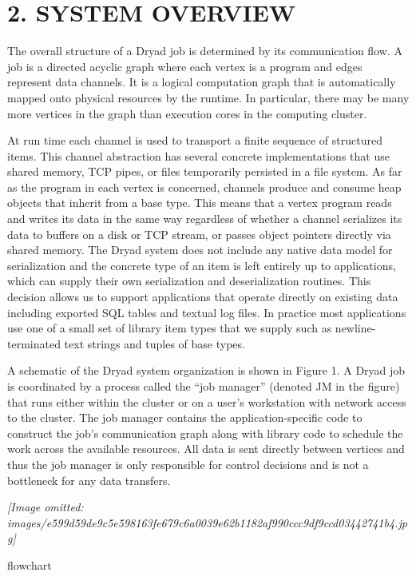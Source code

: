 \documentclass[
]{article}
\begin{document}
\section{2. SYSTEM OVERVIEW}\label{system-overview}

The overall structure of a Dryad job is determined by its communication
flow. A job is a directed acyclic graph where each vertex is a program
and edges represent data channels. It is a logical computation graph
that is automatically mapped onto physical resources by the runtime. In
particular, there may be many more vertices in the graph than execution
cores in the computing cluster.

At run time each channel is used to transport a finite sequence of
structured items. This channel abstraction has several concrete
implementations that use shared memory, TCP pipes, or files temporarily
persisted in a file system. As far as the program in each vertex is
concerned, channels produce and consume heap objects that inherit from a
base type. This means that a vertex program reads and writes its data in
the same way regardless of whether a channel serializes its data to
buffers on a disk or TCP stream, or passes object pointers directly via
shared memory. The Dryad system does not include any native data model
for serialization and the concrete type of an item is left entirely up
to applications, which can supply their own serialization and
deserialization routines. This decision allows us to support
applications that operate directly on existing data including exported
SQL tables and textual log files. In practice most applications use one
of a small set of library item types that we supply such as
newline-terminated text strings and tuples of base types.

A schematic of the Dryad system organization is shown in Figure 1. A
Dryad job is coordinated by a process called the ``job manager''
(denoted JM in the figure) that runs either within the cluster or on a
user's workstation with network access to the cluster. The job manager
contains the application-specific code to construct the job's
communication graph along with library code to schedule the work across
the available resources. All data is sent directly between vertices and
thus the job manager is only responsible for control decisions and is
not a bottleneck for any data transfers.

\textit{[Image omitted: images/e599d59de9c5e598163fe679c6a0039e62b1182af990ccc9df9ccd03442741b4.jpg]}

flowchart
\end{document}
